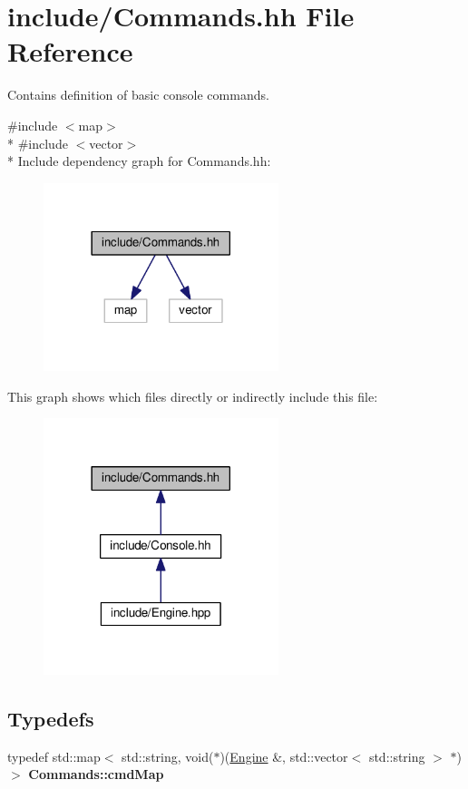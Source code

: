 \hypertarget{Commands_8hh}{}\section{include/\+Commands.hh File Reference}
\label{Commands_8hh}


Contains definition of basic console commands.  


{\ttfamily \#include $<$map$>$}\\*
{\ttfamily \#include $<$vector$>$}\\*
Include dependency graph for Commands.\+hh\+:
\nopagebreak
\begin{figure}[H]
\begin{center}
\leavevmode
\includegraphics[width=194pt]{Commands_8hh__incl}
\end{center}
\end{figure}
This graph shows which files directly or indirectly include this file\+:
\nopagebreak
\begin{figure}[H]
\begin{center}
\leavevmode
\includegraphics[width=194pt]{Commands_8hh__dep__incl}
\end{center}
\end{figure}
\subsection*{Typedefs}
\begin{DoxyCompactItemize}
\item 
typedef std\+::map$<$ std\+::string, void($\ast$)(\hyperlink{classEngine}{Engine} \&, std\+::vector$<$ std\+::string $>$ $\ast$)$>$ {\bfseries Commands\+::cmd\+Map}\hypertarget{Commands_8hh_a7d4b7cb98d97ada6d52d98d496d4645b}{}\label{Commands_8hh_a7d4b7cb98d97ada6d52d98d496d4645b}

\end{DoxyCompactItemize}
